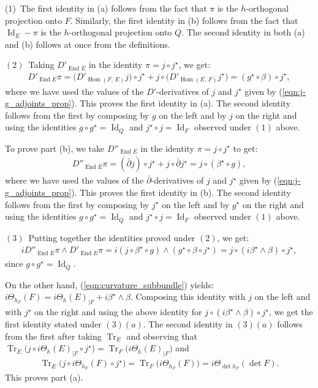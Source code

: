 \documentclass[12pt]{article}
\begin{document}
 (1)\, The first identity in (a) follows from the fact that $\pi$ is the $h$-orthogonal projection onto $F$. Similarly, the first identity in (b) follows from the fact that $\operatorname{Id}_E - \pi$ is the $h$-orthogonal projection onto $Q$. The second identity in both (a) and (b) follows at once from the definitions.

$(2)$\, Taking $D'_{\operatorname{End}E}$ in the identity $\pi = j\circ j^\star$, we get: \begin{eqnarray*}D'_{\operatorname{End}E}\pi = \bigg(D'_{\operatorname{Hom}(F,\,E)}j\bigg)\circ j^\star + j\circ\bigg(D'_{\operatorname{Hom}(E,\,F)}j^\star\bigg) = (g^\star\circ\beta)\circ j^\star,\end{eqnarray*} where we have used the values of the $D'$-derivatives of $j$ and $j^\star$ given by (\ref{eqn:j-g_adjoints_prop}). This proves the first identity in (a). The second identity follows from the first by composing by $g$ on the left and by $j$ on the right and using the identities $g\circ g^\star = \operatorname{Id}_Q$ and $j^\star\circ j = \operatorname{Id}_F$ observed under $(1)$ above.

To prove part (b), we take $D''_{\operatorname{End}E}$ in the identity $\pi = j\circ j^\star$ to get: \begin{eqnarray*}D''_{\operatorname{End}E}\pi = (\bar\partial j)\circ j^\star + j\circ\bar\partial j^\star = j\circ(\beta^\star\circ g),\end{eqnarray*} where we have used the values of the $\bar\partial$-derivatives of $j$ and $j^\star$ given by (\ref{eqn:j-g_adjoints_prop}). This proves the first identity in (b). The second identity follows from the first by composing by $j^\star$ on the left and by $g^\star$ on the right and using the identities $g\circ g^\star = \operatorname{Id}_Q$ and $j^\star\circ j = \operatorname{Id}_F$ observed under $(1)$ above.

$(3)$\, Putting together the identities proved under $(2)$, we get: \begin{eqnarray*}iD''_{\operatorname{End}E}\pi\wedge D'_{\operatorname{End}E}\pi = i(j\circ\beta^\star\circ g)\wedge(g^\star\circ\beta\circ j^\star) = j\circ(i\beta^\star\wedge\beta)\circ j^\star,\end{eqnarray*} since $g\circ g^\star = \operatorname{Id}_Q$.

On the other hand, (\ref{eqn:curvature_subbundle}) yields: $i\Theta_{h_F}(F) = i\Theta_h(E)_{|F} + i\beta^\star\wedge\beta$. Composing this identity with $j$ on the left and with $j^\star$ on the right and using the above identity for $j\circ(i\beta^\star\wedge\beta)\circ j^\star$, we get the first identity stated under $(3)(a)$. The second identity in $(3)(a)$ follows from the first after taking $\operatorname{Tr}_E$ and observing that $\operatorname{Tr}_E\bigg(j\circ i\Theta_h(E)_{|F}\circ j^\star\bigg) = \operatorname{Tr}_F\bigg(i\Theta_h(E)_{|F}\bigg)$ and \begin{eqnarray*}\operatorname{Tr}_E\bigg(j\circ i\Theta_{h_F}(F)\circ j^\star\bigg) = \operatorname{Tr}_F\bigg(i\Theta_{h_F}(F)\bigg) = i\Theta_{\det h_F}(\det F).\end{eqnarray*} This proves part (a).
\end{document}
